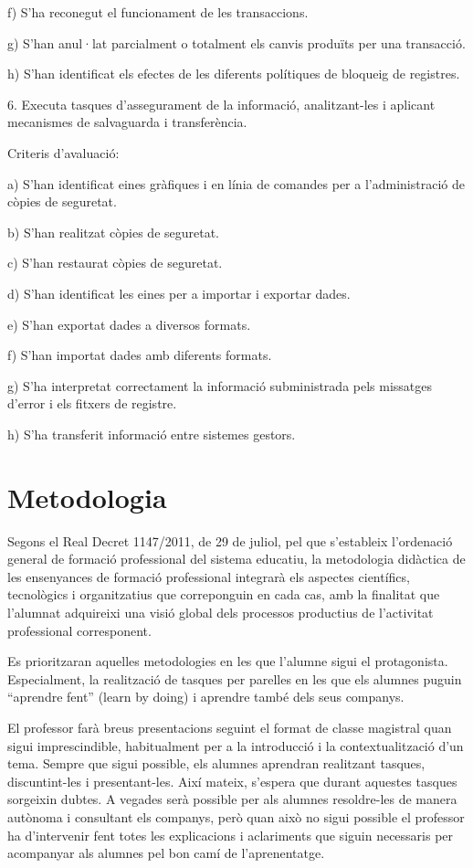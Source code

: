 \documentclass[catalan, a4paper, 12pt, titlepage]{article}
\begin{document}
f) S'ha reconegut el funcionament de les transaccions.

g) S'han anul·lat parcialment o totalment els canvis produïts per una transacció.

h) S'han identificat els efectes de les diferents polítiques de bloqueig de registres.

6. Executa tasques d'assegurament de la informació, analitzant-les i aplicant mecanismes de salvaguarda i transferència.

Criteris d'avaluació:

a) S'han identificat eines gràfiques i en línia de comandes per a l'administració de còpies de seguretat.

b) S'han realitzat còpies de seguretat.

c) S'han restaurat còpies de seguretat.

d) S'han identificat les eines per a importar i exportar dades.

e) S'han exportat dades a diversos formats.

f) S'han importat dades amb diferents formats.

g) S'ha interpretat correctament la informació subministrada pels missatges d'error i els fitxers de registre.

h) S'ha transferit informació entre sistemes gestors.

\section{Metodologia}

Segons el Real Decret 1147/2011, de 29 de juliol, pel que s'estableix l'ordenació general de formació professional del sistema educatiu, la metodologia didàctica de les ensenyances de formació professional integrarà els aspectes científics, tecnològics i organitzatius que correponguin en cada cas, amb la finalitat que l'alumnat adquireixi una visió global dels processos productius de l'activitat professional corresponent.

Es prioritzaran aquelles metodologies en les que l'alumne sigui el protagonista. Especialment, la realització de tasques per parelles en les que els alumnes puguin ``aprendre fent'' (learn by doing) i aprendre també dels seus companys.

El professor farà breus presentacions seguint el format de classe magistral quan sigui imprescindible, habitualment per a la introducció i la contextualització d'un tema.
Sempre que sigui possible, els alumnes aprendran realitzant tasques, discuntint-les i presentant-les.
Així mateix, s'espera que durant aquestes tasques sorgeixin dubtes. 
A vegades serà possible per als alumnes resoldre-les de manera autònoma i consultant els companys, però quan això no sigui possible el professor ha d'intervenir fent totes les explicacions i aclariments que siguin necessaris per acompanyar als alumnes pel bon camí de l'aprenentatge.
\end{document}
